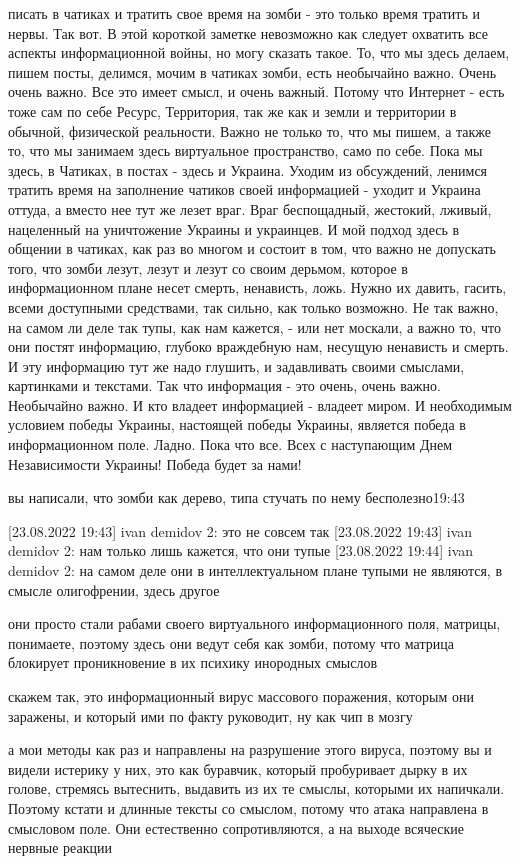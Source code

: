 писать в чатиках и тратить свое время на зомби - это только время тратить и
нервы. Так вот. В этой короткой заметке невозможно как следует охватить все
аспекты информационной войны, но могу сказать такое. То, что мы здесь делаем,
пишем посты, делимся, мочим в чатиках зомби, есть необычайно важно. Очень очень
важно. Все это имеет смысл, и очень важный. Потому что Интернет - есть тоже сам
по себе Ресурс, Территория, так же как и земли и территории в обычной,
физической реальности. Важно не только то, что мы пишем, а также то, что мы
занимаем здесь виртуальное пространство, само по себе. Пока мы здесь, в
Чатиках, в постах - здесь и Украина. Уходим из обсуждений, ленимся тратить
время на заполнение чатиков своей информацией - уходит и Украина оттуда, а
вместо нее тут же лезет враг. Враг беспощадный, жестокий, лживый, нацеленный на
уничтожение Украины и украинцев. И мой подход здесь в общении в чатиках, как
раз во многом и состоит в том, что важно не допускать того, что зомби лезут,
лезут и лезут со своим дерьмом, которое в информационном плане несет смерть,
ненависть, ложь. Нужно их давить, гасить, всеми доступными средствами, так
сильно, как только возможно. Не так важно, на самом ли деле так тупы, как нам
кажется, - или нет москали, а важно то, что они постят информацию, глубоко
враждебную нам, несущую ненависть и смерть. И эту информацию тут же надо
глушить, и задавливать своими смыслами, картинками и текстами. Так что
информация - это очень, очень важно. Необычайно важно. И кто владеет
информацией - владеет миром. И необходимым условием победы Украины, настоящей
победы Украины, является победа в информационном поле.  Ладно. Пока что все.
Всех с наступающим Днем Независимости Украины! Победа будет за нами!

вы написали, что зомби как дерево, типа стучать по нему бесполезно19:43

[23.08.2022 19:43] ivan demidov 2: это не совсем так
[23.08.2022 19:43] ivan demidov 2: нам только лишь кажется, что они тупые
[23.08.2022 19:44] ivan demidov 2: на самом деле они в интеллектуальном плане тупыми не являются, в смысле олигофрении, здесь другое

они просто стали рабами своего виртуального информационного поля, матрицы,
понимаете, поэтому здесь они ведут себя как зомби, потому что матрица блокирует
проникновение в их психику инородных смыслов

скажем так, это информационный вирус массового поражения, которым они заражены,
и который ими по факту руководит, ну как чип в мозгу

а мои методы как раз и направлены на разрушение этого вируса, поэтому вы и
видели истерику у них, это как буравчик, который пробуривает дырку в их голове,
стремясь вытеснить, выдавить из их те смыслы, которыми их напичкали. Поэтому
кстати и длинные тексты со смыслом, потому что атака направлена в смысловом
поле. Они естественно сопротивляются, а на выходе всяческие нервные реакции
